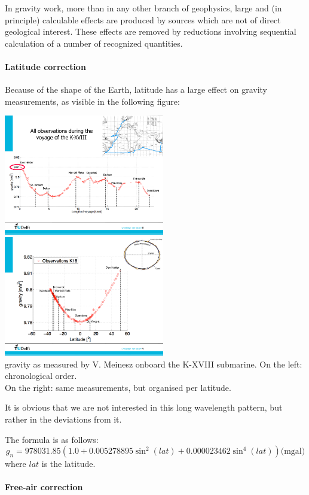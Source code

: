 In gravity work, more than in any other branch of geophysics, large and
(in principle) calculable effects are produced by sources which are not of
direct geological interest. These effects are removed by reductions involving
sequential calculation of a number of recognized quantities.

\paragraph{Latitude correction} Because of the shape of the Earth, 
latitude has a large effect on gravity measurements, as visible in 
the following figure:

\begin{center}
\includegraphics[width=7cm]{images/gravity/vm3}
\includegraphics[width=7cm]{images/gravity/vm2}\\
{\captionfont gravity as measured by V. Meinesz onboard the K-XVIII
submarine. On the left: chronological order.\\ On the right: same 
measurements, but organised per latitude. }
\end{center}

It is obvious that we are not interested in this long wavelength pattern, but 
rather in the deviations from it. 

The formula is as follows:
\[
g_n = 978031.85 (1.0 + 0.005278895 \sin^2(lat) + 0.000023462 \sin^4(lat)) \text{(mgal)}
\]
where $lat$ is the latitude.

\paragraph{Free-air correction}

